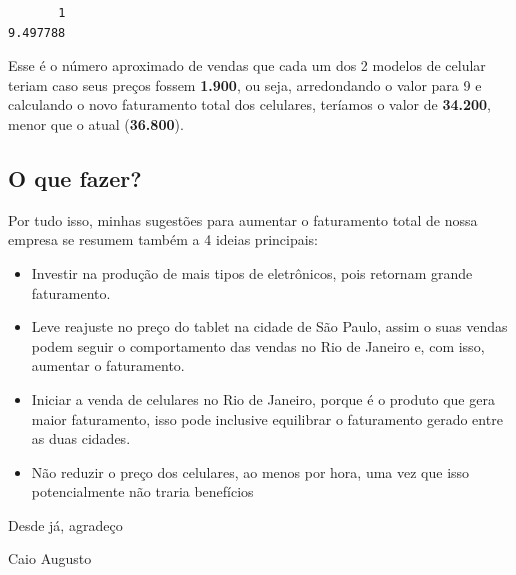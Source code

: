 \documentclass[
  letterpaper,
  DIV=11,
  numbers=noendperiod]{scrartcl}
\begin{document}
\begin{verbatim}
       1 
9.497788 
\end{verbatim}

Esse é o número aproximado de vendas que cada um dos 2 modelos de
celular teriam caso seus preços fossem \textbf{1.900}, ou seja,
arredondando o valor para 9 e calculando o novo faturamento total dos
celulares, teríamos o valor de \textbf{34.200}, menor que o atual
(\textbf{36.800}).

\subsection{O que fazer?}\label{o-que-fazer}

Por tudo isso, minhas sugestões para aumentar o faturamento total de
nossa empresa se resumem também a 4 ideias principais:

\begin{itemize}
\item
  Investir na produção de mais tipos de eletrônicos, pois retornam
  grande faturamento.
\item
  Leve reajuste no preço do tablet na cidade de São Paulo, assim o suas
  vendas podem seguir o comportamento das vendas no Rio de Janeiro e,
  com isso, aumentar o faturamento.
\item
  Iniciar a venda de celulares no Rio de Janeiro, porque é o produto que
  gera maior faturamento, isso pode inclusive equilibrar o faturamento
  gerado entre as duas cidades.
\item
  Não reduzir o preço dos celulares, ao menos por hora, uma vez que isso
  potencialmente não traria benefícios
\end{itemize}

Desde já, agradeço

Caio Augusto
\end{document}

